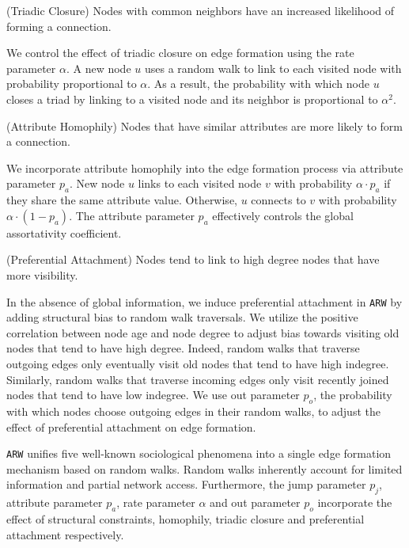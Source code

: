 \begin{ph}
(Triadic Closure) Nodes with common neighbors have an
increased likelihood of forming a connection. \cite{simmel1950sociology}
\end{ph}

We control the effect of triadic closure on edge formation using the
rate parameter $\alpha$. A new node $u$ uses a random walk to
link to each visited node with probability proportional to $\alpha$. As a
result, the probability with which node $u$ closes a triad by linking to
a visited node and its neighbor is proportional to $\alpha^2$.

\begin{ph}
(Attribute Homophily) Nodes that have similar attributes are more likely
to form a connection. \cite{mcpherson2001birds}
\end{ph}
We incorporate attribute homophily into the edge formation process via attribute parameter $p_a$. New node
$u$ links to each visited node $v$ with probability $\alpha \cdot p_a$ if they share
the same attribute value. Otherwise, $u$ connects to $v$ with probability $\alpha \cdot (1-p_a)$.
The attribute parameter $p_a$ effectively controls the global assortativity coefficient.

\begin{ph}
(Preferential Attachment) Nodes tend to link to high degree nodes that have more
visibility. \cite{barabasi1999emergence}
\end{ph}
In the absence of global information, we induce preferential attachment
in \texttt{ARW} by adding structural bias to random walk traversals. We utilize the positive correlation
between node age and node degree to adjust bias towards visiting old nodes that tend to have high degree.
Indeed, random walks that traverse outgoing edges only eventually visit old nodes that tend to have high indegree.
Similarly, random walks that traverse incoming edges only visit recently joined nodes that tend to have low indegree.
We use out parameter $p_o$, the probability with which nodes choose outgoing edges in their
random walks, to adjust the effect of preferential attachment on edge formation.

\texttt{ARW} unifies five well-known sociological phenomena into a single edge
formation mechanism based on random walks. Random walks inherently account for
limited information and partial network access. Furthermore, the jump parameter $p_j$, attribute parameter $p_a$,
rate parameter $\alpha$ and out parameter $p_o$ incorporate the effect of structural constraints,
homophily, triadic closure and preferential attachment respectively.



